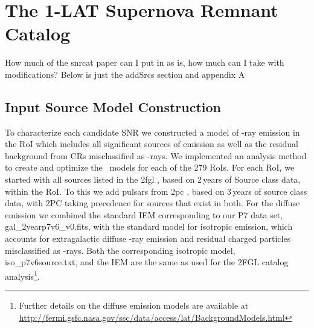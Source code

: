 \chapter{The 1\st \Fermi -LAT Supernova Remnant Catalog}
\label{chap:snrCat}



How much of the \gls{snrcat} paper can I put in as is, how much can I take with modifications? Below is just the addSrcs section and appendix A

\section{Input Source Model Construction}\label{Sec:AddSrcs}

To characterize each candidate SNR we constructed a %
model of \g-ray emission in the RoI which includes all significant sources of emission as well as the residual background from CRs misclassified as \g-rays. We implemented an analysis method to create and optimize the ~models for each of the 279 RoIs. For each RoI, we started with all sources listed in 
the \gls{2fgl} \citep{Nolan12-2FGL}, based on $2$\,years of Source class data, within the RoI. To this we add pulsars from \gls{2pc} \citep{Abdo13-2PC}, based on $3$\,years of source class data, with 2PC taking precedence for sources that exist in both. 
For the diffuse emission we combined the standard IEM corresponding to our P7 data set, gal\_2yearp7v6\_v0.fits, with the standard %
model for isotropic emission, which accounts for extragalactic diffuse \g-ray emission and residual charged particles misclassified as \g-rays. 
Both the corresponding isotropic model, iso\_p7v6source.txt, and the IEM are the same as used for the 2FGL catalog analysis\footnote{Further details on the diffuse emission models are available at \url{http://fermi.gsfc.nasa.gov/ssc/data/access/lat/BackgroundModels.html}}.


